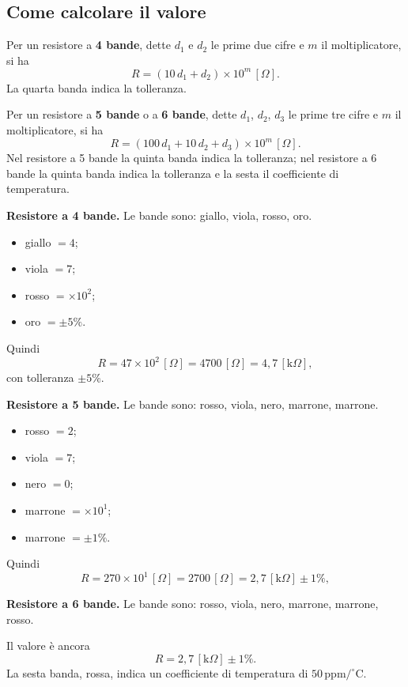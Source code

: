 \subsection{Come calcolare il valore}

Per un resistore a \textbf{4 bande}, dette \(d_1\) e \(d_2\) le prime due cifre e \(m\) il moltiplicatore, si ha
\[
R = (10\,d_1 + d_2)\times 10^m\,[\Omega].
\]
La quarta banda indica la tolleranza.

Per un resistore a \textbf{5 bande} o a \textbf{6 bande}, dette \(d_1\), \(d_2\), \(d_3\) le prime tre cifre e \(m\) il moltiplicatore, si ha
\[
R = (100\,d_1 + 10\,d_2 + d_3)\times 10^m\,[\Omega].
\]
Nel resistore a 5 bande la quinta banda indica la tolleranza; nel resistore a 6 bande la quinta banda indica la tolleranza e la sesta il coefficiente di temperatura.

\begin{esempio}
\textbf{Resistore a 4 bande.} Le bande sono: giallo, viola, rosso, oro.

\begin{itemize}[leftmargin=1cm]
  \item giallo \(= 4\);
  \item viola \(= 7\);
  \item rosso \(= \times 10^2\);
  \item oro \(= \pm 5\%\).
\end{itemize}

Quindi
\[
R = 47 \times 10^2\,[\Omega] = 4700\,[\Omega] = 4{,}7\,[\text{k}\Omega],
\]
con tolleranza \(\pm 5\%\).
\end{esempio}

\begin{esempio}
\textbf{Resistore a 5 bande.} Le bande sono: rosso, viola, nero, marrone, marrone.

\begin{itemize}[leftmargin=1cm]
  \item rosso \(= 2\);
  \item viola \(= 7\);
  \item nero \(= 0\);
  \item marrone \(= \times 10^1\);
  \item marrone \(= \pm 1\%\).
\end{itemize}

Quindi
\[
R = 270 \times 10^1\,[\Omega] = 2700\,[\Omega] = 2{,}7\,[\text{k}\Omega] \pm 1\%,
\]
\end{esempio}

\begin{esempio}
\textbf{Resistore a 6 bande.} Le bande sono: rosso, viola, nero, marrone, marrone, rosso.

Il valore è ancora
\[
R = 2{,}7\,[\text{k}\Omega] \pm 1\%.
\]
La sesta banda, rossa, indica un coefficiente di temperatura di \(50\,\text{ppm}/^\circ\text{C}\).
\end{esempio}

